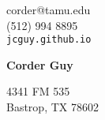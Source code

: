 \documentclass[12pt]{article}
\begin{document}

\noindent
\begin{minipage}{0.3\linewidth}
  \begin{flushleft}
    corder@tamu.edu\\
    (512) 994 8895\\
    \verb|jcguy.github.io|
  \end{flushleft}
\end{minipage}
\hfill
\begin{minipage}{0.3\linewidth}
  \begin{center}
    {\Huge\textbf{Corder Guy}}
  \end{center}
\end{minipage}
\hfill
\begin{minipage}{0.3\linewidth}
  \begin{flushright}
    4341 FM 535 \\
    Bastrop, TX 78602 \\
  \end{flushright}
\end{minipage}

\end{document}
